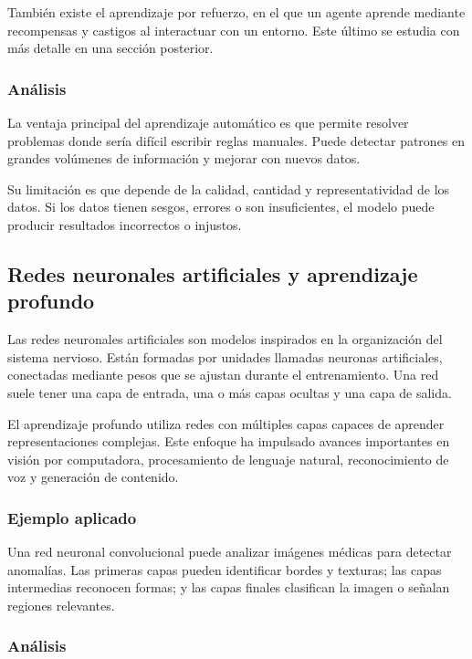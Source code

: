 También existe el aprendizaje por refuerzo, en el que un agente aprende mediante recompensas y castigos al interactuar con un entorno. Este último se estudia con más detalle en una sección posterior.

\subsubsection{Análisis}

La ventaja principal del aprendizaje automático es que permite resolver problemas donde sería difícil escribir reglas manuales. Puede detectar patrones en grandes volúmenes de información y mejorar con nuevos datos.

Su limitación es que depende de la calidad, cantidad y representatividad de los datos. Si los datos tienen sesgos, errores o son insuficientes, el modelo puede producir resultados incorrectos o injustos.

\subsection{Redes neuronales artificiales y aprendizaje profundo}

Las redes neuronales artificiales son modelos inspirados en la organización del sistema nervioso. Están formadas por unidades llamadas neuronas artificiales, conectadas mediante pesos que se ajustan durante el entrenamiento. Una red suele tener una capa de entrada, una o más capas ocultas y una capa de salida.

El aprendizaje profundo utiliza redes con múltiples capas capaces de aprender representaciones complejas. Este enfoque ha impulsado avances importantes en visión por computadora, procesamiento de lenguaje natural, reconocimiento de voz y generación de contenido.

\subsubsection{Ejemplo aplicado}

Una red neuronal convolucional puede analizar imágenes médicas para detectar anomalías. Las primeras capas pueden identificar bordes y texturas; las capas intermedias reconocen formas; y las capas finales clasifican la imagen o señalan regiones relevantes.

\subsubsection{Análisis}

